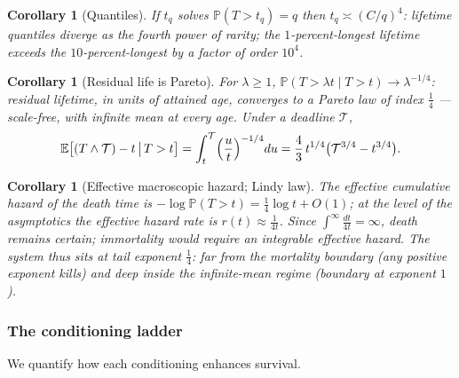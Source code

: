 \documentclass[11pt]{article}
\numberwithin{equation}{section}
\theoremstyle{plain}
\newtheorem{corollary}[theorem]{Corollary}
\theoremstyle{definition}
\theoremstyle{remark}
\newcommand{\E}{\mathbb{E}}
\newcommand{\PP}{\mathbb{P}}
\begin{document}
\begin{corollary}[Quantiles]\label{sh:cor:quant}
If $t_q$ solves $\PP(T>t_q)=q$ then $t_q\asymp(C/q)^4$: lifetime quantiles
diverge as the \emph{fourth power} of rarity; the $1$-percent-longest
lifetime exceeds the $10$-percent-longest by a factor of order $10^4$.
\end{corollary}

\begin{corollary}[Residual life is Pareto]\label{sh:cor:residual}
For $\lambda\ge1$,
$\PP(T>\lambda t\mid T>t)\to\lambda^{-1/4}$: residual lifetime, in units of
attained age, converges to a Pareto law of index $\tfrac14$ ---
scale-free, with infinite mean at every age. Under a deadline
$\mathcal T$,
\[
\E\bigl[(T\wedge\mathcal T)-t\,\big|\,T>t\bigr]
=\int_t^{\mathcal T}\Bigl(\frac ut\Bigr)^{-1/4}du
=\frac43\,t^{1/4}\bigl(\mathcal T^{3/4}-t^{3/4}\bigr).
\]
\end{corollary}

\begin{corollary}[Effective macroscopic hazard; Lindy law]\label{sh:cor:lindy}
The effective cumulative hazard of the death time is
$-\log\PP(T>t)=\tfrac14\log t+O(1)$; at the level of the asymptotics the
effective hazard rate is $r(t)\approx\tfrac1{4t}$. Since
$\int^\infty\tfrac{dt}{4t}=\infty$, death remains certain; immortality
would require an integrable effective hazard. The system thus sits at tail
exponent $\tfrac14$: far from the mortality boundary (any positive exponent
kills) and deep inside the infinite-mean regime (boundary at exponent $1$).
\end{corollary}

\subsubsection{The conditioning ladder}\label{sh:subsub:ladder}

We quantify how each conditioning enhances survival.
\end{document}
